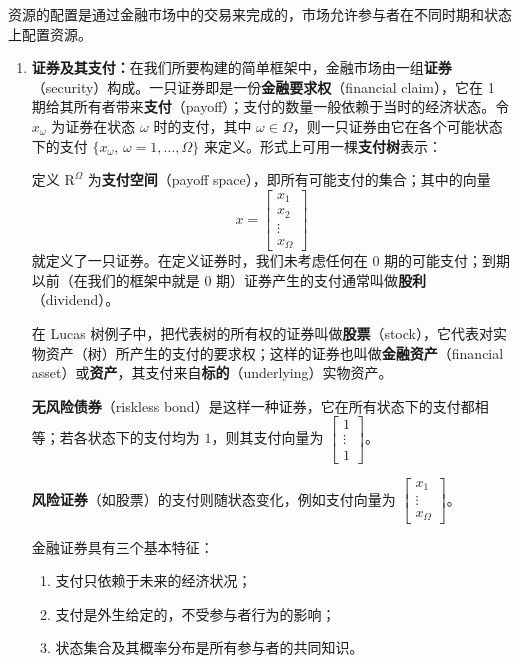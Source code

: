 \begin{tcolorbox}[knowledge,title=2.3 证券市场]
资源的配置是通过金融市场中的交易来完成的，市场允许参与者在不同时期和状态上配置资源。

\tcbline

\begin{enumerate}
    \item \textbf{证券及其支付：}在我们所要构建的简单框架中，金融市场由一组\textbf{证券}（security）构成。一只证券即是一份\textbf{金融要求权}（financial claim），它在 1 期给其所有者带来\textbf{支付}（payoff）；支付的数量一般依赖于当时的经济状态。令 $x_\omega$ 为证券在状态 $\omega$ 时的支付，其中 $\omega\in\Omega$，则一只证券由它在各个可能状态下的支付 $\{x_\omega,\,\omega=1,\dots,\Omega\}$ 来定义。形式上可用一棵\textbf{支付树}表示：
    \begin{center}
    \end{center}
    定义 $\mathrm{R}^{\Omega}$ 为\textbf{支付空间}（payoff space），即所有可能支付的集合；其中的向量
    \[
        x=\begin{bmatrix}x_1 \\ x_2 \\ \vdots \\ x_\Omega\end{bmatrix}
    \]
    就定义了一只证券。在定义证券时，我们未考虑任何在 0 期的可能支付；到期以前（在我们的框架中就是 0 期）证券产生的支付通常叫做\textbf{股利}（dividend）。
    
    在 Lucas 树例子中，把代表树的所有权的证券叫做\textbf{股票}（stock），它代表对实物资产（树）所产生的支付的要求权；这样的证券也叫做\textbf{金融资产}（financial asset）或\textbf{资产}，其支付来自\textbf{标的}（underlying）实物资产。

    \textbf{无风险债券}（riskless bond）是这样一种证券，它在所有状态下的支付都相等；若各状态下的支付均为 $1$，则其支付向量为 $\begin{bmatrix}1 \\ \vdots \\ 1\end{bmatrix}$。
    
    \textbf{风险证券}（如股票）的支付则随状态变化，例如支付向量为 $\begin{bmatrix}x_1 \\ \vdots \\ x_\Omega\end{bmatrix}$。
    
    金融证券具有三个基本特征：
    \begin{enumerate}
        \item 支付只依赖于未来的经济状况；
        \item 支付是外生给定的，不受参与者行为的影响；
        \item 状态集合及其概率分布是所有参与者的共同知识。
    \end{enumerate}


\end{enumerate}
\end{tcolorbox}

